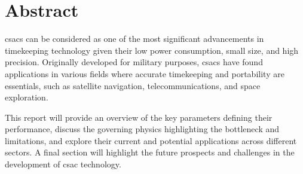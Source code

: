 



\section*{Abstract}

\acrfull{csacs} can be considered as one of the most significant advancements in timekeeping technology given their low power consumption, small size, and high precision.
Originally developed for military purposes, \acrshort{csacs} have found applications in various fields where accurate timekeeping and portability are essentials, such as satellite navigation, telecommunications, and space exploration.

This report will provide an overview of the key parameters defining their performance, discuss the governing physics highlighting the bottleneck and limitations, and explore their current and potential applications across different sectors.
A final section will highlight the future prospects and challenges in the development of \acrshort{csac} technology.